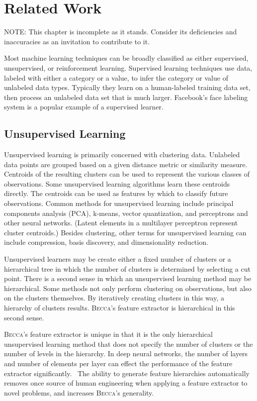 \chapter{Related Work}

NOTE: This chapter is incomplete as it stands. Consider its deficiencies and inaccuracies as an invitation to contribute to it.

Most machine learning techniques can be broadly classified as either supervised, unsupervised, or reinforcement learning. Supervised learning techniques use data, labeled with either a category or a value, to infer the category or value of unlabeled data types. Typically they learn on a human-labeled training data set, then process an unlabeled data set that is much larger. Facebook's face labeling system is a popular example of a supervised learner.

\section{Unsupervised Learning}
Unsupervised learning is primarily concerned with clustering data. Unlabeled data points are grouped based on a given distance metric or similarity measure. Centroids of the resulting clusters can be used to represent the various classes of observations. Some unsupervised learning algorithms learn these centroids directly. The centroids can be used as features by which to classify future observations. Common methods for unsupervised learning include principal components analysis (PCA), k-means, vector quantization, and perceptrons and other neural networks. (Latent elements in a multilayer perceptron represent cluster centroids.) Besides clustering, other terms for unsupervised learning can include compression, basis discovery, and dimensionality reduction.

Unsupervised learners may be create either a fixed number of clusters or a hierarchical tree in which the number of clusters is determined by selecting a cut point. There is a second sense in which an unsupervised learning method may be hierarchical. Some methods not only perform clustering on observations, but also on the clusters themselves. By iteratively creating clusters in this way, a hierarchy of clusters results. \textsc{Becca}'s feature extractor is hierarchical in this second sense.

\textsc{Becca}'s feature extractor is unique in that it is the only hierarchical unsupervised learning method that does not specify the number of clusters or the number of levels in the hierarchy. In deep neural networks, the number of layers and number of elements per layer can effect the performance of the feature extractor significantly.~\cite{montavon11} The ability to generate feature hierarchies automatically removes once source of human engineering when applying a feature extractor to novel problems, and increases \textsc{Becca}'s generality.

